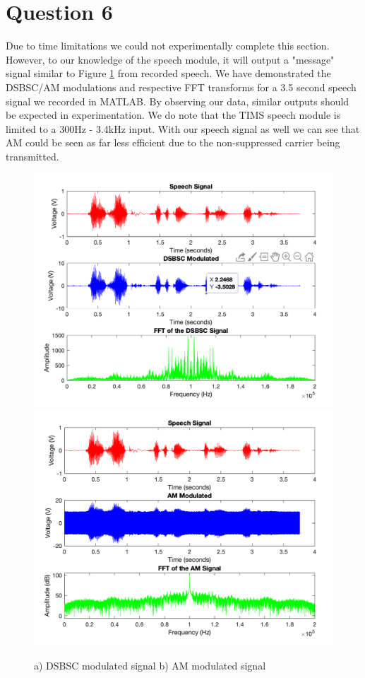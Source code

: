 \documentclass[11pt]{article}
\begin{document}
\section*{Question 6}
Due to time limitations we could not experimentally complete this section. However, to our knowledge of the speech module, it will output a "message" signal similar to Figure \ref{fig:q6} from recorded speech. We have demonstrated the DSBSC/AM modulations and respective FFT transforms for a 3.5 second speech signal we recorded in MATLAB. By observing our data, similar outputs should be expected in experimentation. We do note that the TIMS speech module is limited to a 300Hz - 3.4kHz input. With our speech signal as well we can see that AM could be seen as far less efficient due to the non-suppressed carrier being transmitted. 
\begin{figure}[H]
    \centering
    \includegraphics[scale=0.45]{W2Q6DSBSC.png}
    \includegraphics[scale=0.45]{W2Q6AM.png}
    \caption{a) DSBSC modulated signal b) AM modulated signal}
    \label{fig:q6}
\end{figure}
\end{document}
